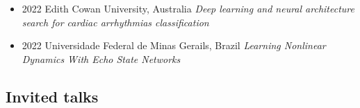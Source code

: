 \documentclass[10pt,A4]{article} %
\begin{document}
\begin{itemize}

    \item {}
    { 2022 }
    {  }
    { Edith Cowan University, Australia }
    { {\it Deep learning and neural architecture search for cardiac arrhythmias classification } }

    \item {}
    { 2022 }
    {  }
    { Universidade Federal de Minas Gerails, Brazil }
    { {\it Learning Nonlinear Dynamics With Echo State Networks } }

\end{itemize}

\subsection{Invited talks}
\end{document}
